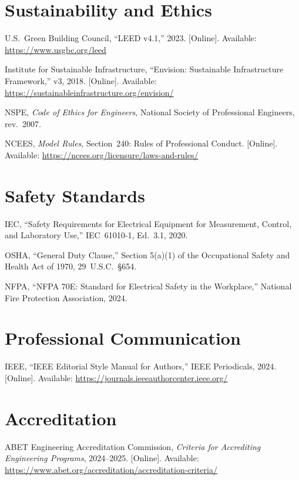\section*{Sustainability and Ethics}
\begin{enumerate}[label={[\arabic*]},leftmargin=2em,resume]
\item U.S.\ Green Building Council, ``LEED v4.1,'' 2023. [Online]. Available: \url{https://www.usgbc.org/leed}
\item Institute for Sustainable Infrastructure, ``Envision: Sustainable Infrastructure Framework,'' v3, 2018. [Online]. Available: \url{https://sustainableinfrastructure.org/envision/}
\item NSPE, \emph{Code of Ethics for Engineers}, National Society of Professional Engineers, rev.\ 2007.
\item NCEES, \emph{Model Rules}, Section~240: Rules of Professional Conduct. [Online]. Available: \url{https://ncees.org/licensure/laws-and-rules/}
\end{enumerate}

\section*{Safety Standards}
\begin{enumerate}[label={[\arabic*]},leftmargin=2em,resume]
\item IEC, ``Safety Requirements for Electrical Equipment for Measurement, Control, and Laboratory Use,'' IEC~61010-1, Ed.~3.1, 2020.
\item OSHA, ``General Duty Clause,'' Section 5(a)(1) of the Occupational Safety and Health Act of 1970, 29~U.S.C.\ \S654.
\item NFPA, ``NFPA 70E: Standard for Electrical Safety in the Workplace,'' National Fire Protection Association, 2024.
\end{enumerate}

\section*{Professional Communication}
\begin{enumerate}[label={[\arabic*]},leftmargin=2em,resume]
\item IEEE, ``IEEE Editorial Style Manual for Authors,'' IEEE Periodicals, 2024. [Online]. Available: \url{https://journals.ieeeauthorcenter.ieee.org/}
\end{enumerate}

\section*{Accreditation}
\begin{enumerate}[label={[\arabic*]},leftmargin=2em,resume]
\item ABET Engineering Accreditation Commission, \emph{Criteria for Accrediting Engineering Programs}, 2024--2025. [Online]. Available: \url{https://www.abet.org/accreditation/accreditation-criteria/}
\end{enumerate}

